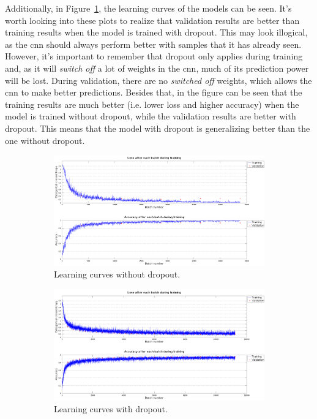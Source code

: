 Additionally, in Figure~\ref{fig:lc_dropout}, the learning curves of the models can be seen. It's worth looking into these plots to realize that validation results are better than training results when the model is trained with dropout. This may look illogical, as the \gls{cnn} should always perform better with samples that it has already seen. However, it's important to remember that dropout only applies during training and, as it will \textit{switch off} a lot of weights in the \gls{cnn}, much of its prediction power will be lost. During validation, there are no \textit{switched off} weights, which allows the \gls{cnn} to make better predictions. Besides that, in the figure can be seen that the training results are much better (i.e. lower loss and higher accuracy) when the model is trained without dropout, while the validation results are better with dropout. This means that the model with dropout is generalizing better than the one without dropout. 
\begin{figure}
	\begin{subfigure}{1\textwidth}
		\centering
		\includegraphics[width=1\linewidth]{figures/lc_nodropout.png}
		\caption{Learning curves without dropout.}
	\end{subfigure}
	\begin{subfigure}{1\textwidth}
		\centering
		\includegraphics[width=1\linewidth]{figures/lc_dropout.png}
		\caption{Learning curves with dropout.}
	\end{subfigure}
	\caption[Learning curves with and without dropout.]{}
	\label{fig:lc_dropout}
\end{figure}

